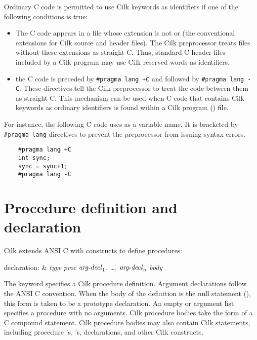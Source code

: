 Ordinary C code is permitted to use Cilk keywords as identifiers if
one of the following conditions is true:
\begin{itemize}
\item The C code appears in a file whose extension is not
 or  (the conventional extensions for
Cilk source and header files).  The Cilk preprocessor treats files
without these extensions as straight C.  Thus, standard C header files
included by a Cilk program may use Cilk reserved words as identifiers.

\item the C code is preceded by \verb|#pragma lang +C| and followed by
\verb|#pragma lang -C|.  These directives tell the Cilk preprocessor
to treat the code between them as straight C\@.  This mechanism can be
used when C code that contains Cilk keywords as ordinary identifiers
is found within a Cilk program () file.
\end{itemize}

For instance, the following C code uses  as a variable
name.  It is bracketed by \verb|#pragma lang| directives to prevent
the preprocessor from issuing syntax errors.
\begin{verbatim}
    #pragma lang +C
    int sync;
    sync = sync+1;
    #pragma lang -C
\end{verbatim}

\section{Procedure definition and declaration}

Cilk extends ANSI C with constructs to define procedures:
\begin{syntax}
declaration{\rm :} &  \textit{type} \textit{proc} \cilkkw{(}$\mbox{\textit{arg-decl}}_1$,
             \dots, $\mbox{\textit{arg-decl}}_n$\cilkkw{)} \textit{body} 
\end{syntax}
The keyword  specifies a Cilk procedure definition.  Argument
declarations follow the ANSI C convention.  When the body of the
definition is the null statement (\cilkkw{;}), this form is taken to
be a prototype declaration.  An empty or  argument list
specifies a procedure with no arguments.  Cilk procedure bodies take the
form of a C compound statement.  Cilk procedure bodies may also contain
Cilk statements, including procedure 's,
's,  declarations, and other Cilk
constructs.

